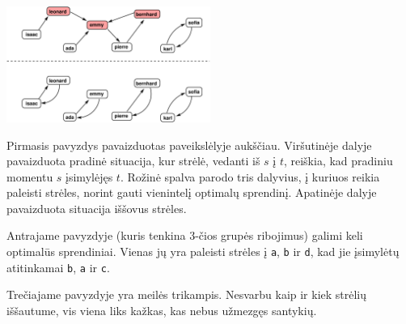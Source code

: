 \section*{\sampleexplanations}

\begin{center}
\includegraphics[width=0.5\textwidth]{polygonfig.pdf}
\end{center}

Pirmasis pavyzdys pavaizduotas paveikslėlyje aukščiau. Viršutinėje dalyje pavaizduota pradinė situacija, kur strėlė, vedanti iš $s$ į $t$, reiškia, kad pradiniu momentu $s$ įsimylėjęs $t$. Rožinė spalva parodo tris dalyvius, į kuriuos reikia paleisti strėles, norint gauti vienintelį optimalų sprendinį. Apatinėje dalyje pavaizduota situacija iššovus strėles.

Antrajame pavyzdyje (kuris tenkina 3-čios grupės ribojimus) galimi keli optimalūs sprendiniai.
Vienas jų yra paleisti strėles į  \texttt{a}, \texttt{b} ir \texttt{d}, kad jie įsimylėtų atitinkamai \texttt{b}, \texttt{a} ir \texttt{c}.

Trečiajame pavyzdyje yra meilės trikampis. Nesvarbu kaip ir kiek strėlių iššautume, vis viena liks kažkas, kas nebus užmezgęs santykių.

